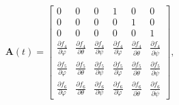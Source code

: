\documentclass[lineno, pdflatex,sn-mathphys-ay]{sn-jnl}
\theoremstyle{thmstyleone}%
\theoremstyle{thmstyletwo}%
\theoremstyle{thmstylethree}%
\renewcommand{\vec}[1]{\boldsymbol{#1}}
\begin{document}
\setcounter{MaxMatrixCols}{12}
\begin{align}
\vec{A}(t)=
\begin{bmatrix}
0 & 0 & 0 & 1 & 0 & 0 \\
0 & 0 & 0 & 0 & 1 & 0 \\
0 & 0 & 0 & 0 & 0 & 1 \\
\frac{\partial f_4}{\partial \varphi} & \frac{\partial f_4}{\partial \theta} & \frac{\partial f_4}{\partial \psi} & \frac{\partial f_4}{\partial \dot{\varphi}} & \frac{\partial f_4}{\partial \dot{\theta}} & \frac{\partial f_4}{\partial \dot{\psi}} \\
\frac{\partial f_5}{\partial \varphi} & \frac{\partial f_5}{\partial \theta} & \frac{\partial f_5}{\partial \psi} & \frac{\partial f_5}{\partial \dot{\varphi}} & \frac{\partial f_5}{\partial \dot{\theta}} & \frac{\partial f_5}{\partial \dot{\psi}} \\
\frac{\partial f_6}{\partial \varphi} & \frac{\partial f_6}{\partial \theta} & \frac{\partial f_6}{\partial \psi} & \frac{\partial f_6}{\partial \dot{\varphi}} & \frac{\partial f_6}{\partial \dot{\theta}} & \frac{\partial f_6}{\partial \dot{\psi}}
\end{bmatrix},
\end{align}
\end{document}
